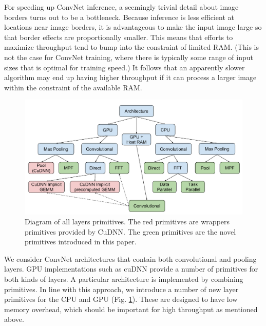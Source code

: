 \documentclass[conference]{./IEEEtran/IEEEtran}
\begin{document}
  For speeding up ConvNet inference, a seemingly trivial detail about
  image borders turns out to be a bottleneck. Because inference is
  less efficient at locations near image borders, it is advantageous
  to make the input image large so that border effects are
  proportionally smaller.  This means that efforts to maximize
  throughput tend to bump into the constraint of limited RAM.  (This
  is not the case for ConvNet training, where there is typically some
  range of input sizes that is optimal for training speed.)  It
  follows that an apparently slower algorithm may end up having higher
  throughput if it can process a larger image within the constraint of
  the available RAM.

  \begin{figure}
    \begin{center}
      \includegraphics[width=0.99\columnwidth]{fig/alllayersram.pdf}
    \end{center}
    \caption{Diagram of all layers primitives.  The red primitives are
      wrappers primitives provided by CuDNN.  The green primitives are
      the novel primitives introduced in this paper.}
    \label{fig:layers}
  \end{figure}

  We consider ConvNet architectures that contain both convolutional
  and pooling layers.  GPU implementations such as cuDNN provide a
  number of primitives for both kinds of layers.  A particular
  architecture is implemented by combining primitives.  In line with
  this approach, we introduce a number of new layer primitives for the
  CPU and GPU (Fig. \ref{fig:layers}).  These are designed to have low
  memory overhead, which should be important for high throughput as
  mentioned above.
\end{document}
